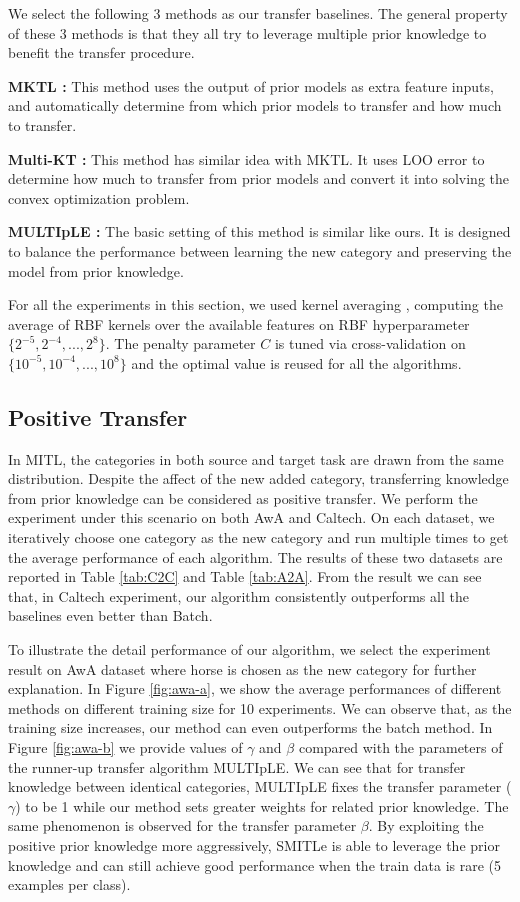 We select the following 3 methods as our transfer baselines. The general property of these 3 methods is that they all try to leverage multiple prior knowledge to benefit the transfer procedure.

\textbf{MKTL \cite{jie2011multiclass}:} This method uses the output of prior models as extra feature inputs, and automatically determine from which prior models to transfer and how much to transfer.


\textbf{Multi-KT \cite{tommasi2014learning}:} This method has similar idea with MKTL. It uses LOO error to determine how much to transfer from prior models and convert it into solving the convex optimization problem.

\textbf{MULTIpLE \cite{kuzborskij2013n}:} The basic setting of this method is similar like ours. It is designed to balance the performance between learning the new category and preserving the model from prior knowledge.

For all the experiments in this section, we used kernel averaging \cite{gehler2009feature}, computing the average of RBF kernels over the available features on RBF hyperparameter $\{2^{-5},2^{-4},...,2^8\}$. The penalty parameter $C$ is tuned via cross-validation on $\{10^{-5},10^{-4},...,10^8\}$ and the optimal value is reused for all the algorithms.

\subsection{Positive Transfer}

In MITL, the categories in both source and target task are drawn from the same distribution. Despite the affect of the new added category, transferring knowledge from prior knowledge can be considered as positive transfer. We perform the experiment under this scenario on both AwA and Caltech. On each dataset, we iteratively choose one category as the new category and run multiple times to get the average performance of each algorithm. The results of these two datasets are reported in Table \ref{tab:C2C} and Table \ref{tab:A2A}. From the result we can see that, in Caltech experiment, our algorithm consistently outperforms all the baselines even better than Batch.

To illustrate the detail performance of our algorithm, we select the experiment result on AwA dataset where horse is chosen as the new category for further explanation. In Figure \ref{fig:awa-a}, we show the average performances of different methods on different training size for 10 experiments. We can observe that, as the training size increases, our method can even outperforms the batch method.
In Figure \ref{fig:awa-b} we provide values of $\gamma$ and $\beta$ compared with the parameters of the runner-up transfer algorithm MULTIpLE. We can see that for transfer knowledge between identical categories, MULTIpLE fixes the transfer parameter ($\gamma$) to be 1 while our method sets greater weights for related prior knowledge. The same phenomenon is observed for the transfer parameter $\beta$. By exploiting the positive prior knowledge more aggressively, SMITLe is able to leverage the prior knowledge and can still achieve good performance when the train data is rare (5 examples per class).


